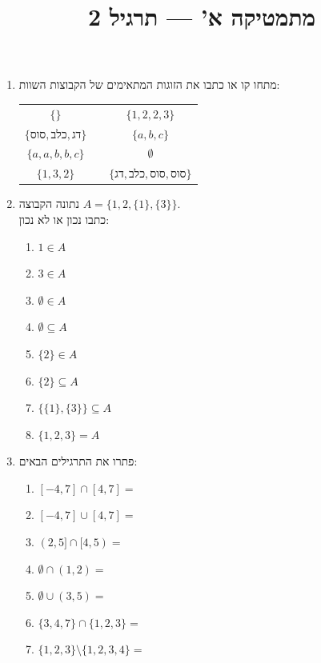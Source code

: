 
\setcounter{secnumdepth}{2}

\title{מתמטיקה א' --- תרגיל 2}
\date{}



\maketitle

\begin{enumerate}
    \item מתחו קו או כתבו את הזוגות המתאימים של הקבוצות השוות:
    \begin{center}
    \begin{tabular}{c c c}
    $\{\}$ & \qquad\qquad & $\{1, 2, 2, 3\}$ \\
    $\{\text{סוס}, \text{כלב}, \text{דג}\}$ & \qquad\qquad & $\{a, b, c\}$ \\
    $\{a, a, b, b, c\}$ & \qquad\qquad & $\emptyset$ \\
    $\{1, 3, 2\}$ & \qquad\qquad & $\{\text{דג}, \text{כלב}, \text{סוס}, \text{סוס}\}$
    \end{tabular}
    \end{center}

    \item נתונה הקבוצה $A = \{1, 2, \{1\}, \{3\}\}$. \\
    כתבו נכון או לא נכון:
	\begin{enumerate}
		\item $1 \in A$
		\item $3 \in A$
		\item $\emptyset \in A$
		\item $\emptyset \subseteq A$
		\item $\{2\} \in A$
		\item $\{2\} \subseteq A$
		\item $\{\{1\}, \{3\}\} \subseteq A$
		\item $\{1, 2, 3\} = A$
	\end{enumerate}

    \item פתרו את התרגילים הבאים:
		\begin{enumerate}
			\item $[-4, 7] \cap [4, 7] =$
			\item $[-4, 7] \cup [4, 7] =$
			\item $(2, 5] \cap [4, 5) =$
			\item $\emptyset \cap (1, 2) =$
			\item $\emptyset \cup (3, 5) =$
			\item $\{3, 4, 7\} \cap \{1, 2, 3\} =$
			\item $\{1, 2, 3\} \setminus \{1, 2, 3, 4\} =$
		\end{enumerate}


\end{enumerate}
